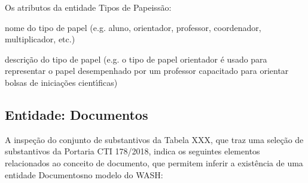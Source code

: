 \documentclass[
12pt,		%
openright,	%
twoside,  %
a4paper,			%
chapter=TITLE,		%
english,			%
french,				%
spanish,			%
brazil				%
]{USPSC-classe/USPSC}
\begin{document}
Os atributos da entidade \textquotedbl Tipos de Papeis\textquotedbl  s\~ao:















\begin{alineas}
\item nome do tipo de papel (e.g. aluno, orientador, professor, coordenador, multiplicador, etc.)
\item descri\c{c}\~ao do tipo de papel (e.g. \textquotedbl o tipo de papel orientador \'e usado para representar o papel desempenhado por um professor capacitado para orientar bolsas de inicia\c{c}\~oes cient\'{\i}ficas\textquotedbl )
\end{alineas}

\subsection[Entidade: Documentos]{Entidade: Documentos}\label{Entidade: Documentos}
A inspe\c{c}\~ao do conjunto de substantivos da Tabela XXX, que traz uma sele\c{c}\~ao de substantivos da Portaria CTI 178/2018, indica os seguintes elementos relacionados ao conceito de \textquotedbl documento\textquotedbl , que permitem inferir a exist\^encia de uma entidade \textquotedbl Documentos\textquotedbl  no modelo do WASH:















\noindent\begin{center}\mbox{\centering{}}\end{center}
\end{document}
